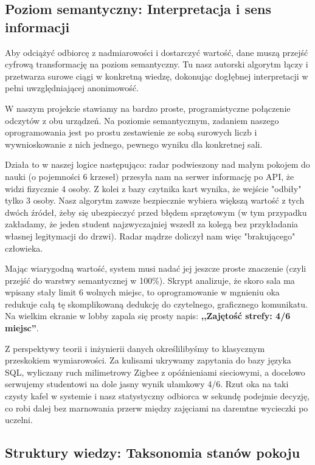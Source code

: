 \documentclass[12pt,a4paper]{article}
\begin{document}
\subsection{Poziom semantyczny: Interpretacja i sens informacji}

Aby odciążyć odbiorcę z nadmiarowości i dostarczyć wartość, dane muszą przejść cyfrową transformację na poziom semantyczny. Tu nasz autorski algorytm łączy i przetwarza surowe ciągi w konkretną wiedzę, dokonując dogłębnej interpretacji w pełni uwzględniającej anonimowość.

W naszym projekcie stawiamy na bardzo proste, programistyczne połączenie odczytów z obu urządzeń. Na poziomie semantycznym, zadaniem naszego oprogramowania jest po prostu zestawienie ze sobą surowych liczb i wywnioskowanie z nich jednego, pewnego wyniku dla konkretnej sali.

Działa to w naszej logice następująco: radar podwieszony nad małym pokojem do nauki (o pojemności 6 krzeseł) przesyła nam na serwer informację po API, że widzi fizycznie 4 osoby. Z kolei z bazy czytnika kart wynika, że wejście "odbiły" tylko 3 osoby. Nasz algorytm zawsze bezpiecznie wybiera większą wartość z tych dwóch źródeł, żeby się ubezpieczyć przed błędem sprzętowym (w tym przypadku zakładamy, że jeden student najzwyczajniej wszedł za kolegą bez przykładania własnej legitymacji do drzwi). Radar mądrze doliczył nam więc "brakującego" człowieka.

Mając wiarygodną wartość, system musi nadać jej jeszcze proste znaczenie (czyli przejść do warstwy semantycznej w 100\%). Skrypt analizuje, że skoro sala ma wpisany stały limit 6 wolnych miejsc, to oprogramowanie w mgnieniu oka redukuje całą tę skomplikowaną dedukcję do czytelnego, graficznego komunikatu. Na wielkim ekranie w lobby zapala się prosty napis: \textbf{,,Zajętość strefy: 4/6 miejsc''}.

Z perspektywy teorii i inżynierii danych określilibyśmy to klasycznym przeskokiem wymiarowości. Za kulisami ukrywamy zapytania do bazy języka SQL, wyliczany ruch milimetrowy Zigbee z opóźnieniami sieciowymi, a docelowo serwujemy studentowi na dole jasny wynik ułamkowy 4/6. Rzut oka na taki czysty kafel w systemie i nasz statystyczny odbiorca w sekundę podejmie decyzję, co robi dalej bez marnowania przerw między zajęciami na daremtne wycieczki po uczelni.

\subsection{Struktury wiedzy: Taksonomia stanów pokoju}
\end{document}
